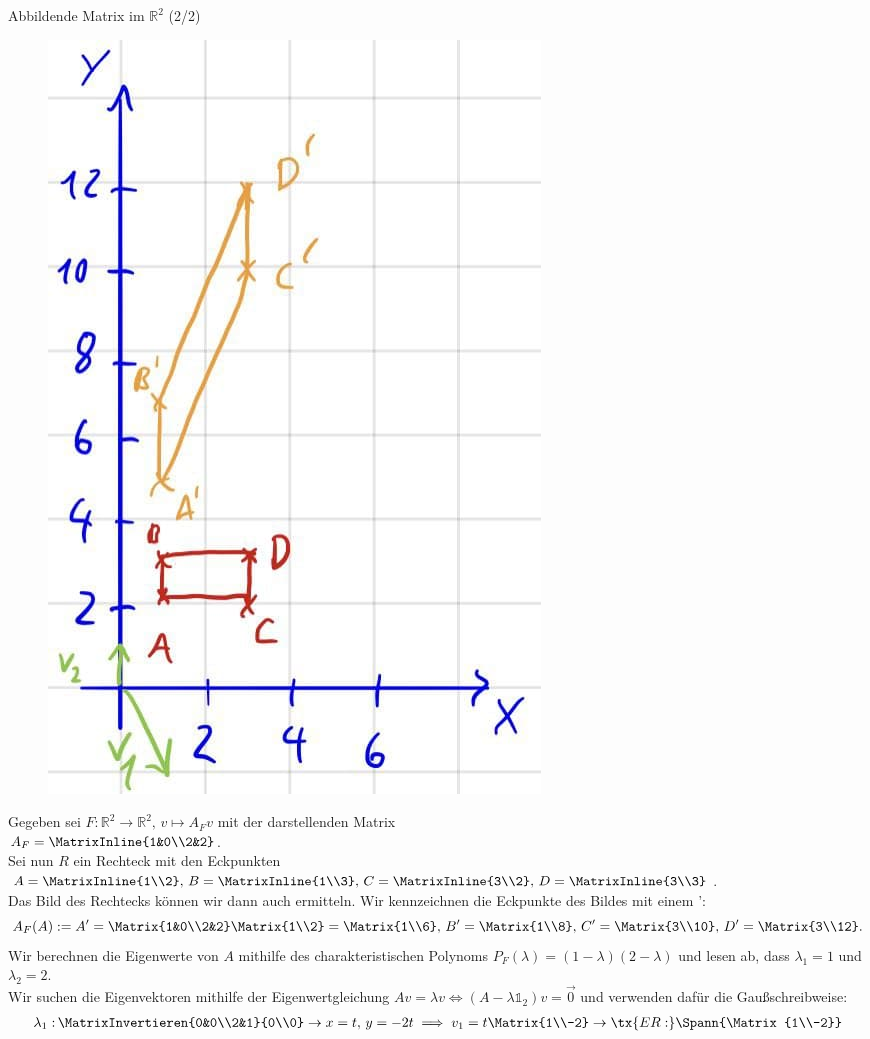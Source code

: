 \begin{Beispiel}
{Abbildende Matrix im $\mathbb{R}^2$ (2/2)}
\begin{figure}
 \vspace{-15pt}
\includegraphics[width=.15\textwidth]{Dateien/02/02Anschauung1.jpg}
 \vspace{-15pt}
\end{figure}
Gegeben sei $F:\mathbb{R}^2\to\mathbb{R}^2,\,v\mapsto A_Fv$ mit der darstellenden Matrix\\
$A_F=\MatrixInline{1&0\\2&2}$.\\
Sei nun $R$ ein Rechteck mit den Eckpunkten\\
$A=\MatrixInline{1\\2},\,B=\MatrixInline{1\\3},\,C=\MatrixInline{3\\2},\,D=\MatrixInline{3\\3}$.\\
Das Bild des Rechtecks können wir dann auch ermitteln.
Wir kennzeichnen die Eckpunkte des Bildes mit einem ':
\begin{equation*}
    A_F(A):=A'=\Matrix{1&0\\2&2}\Matrix{1\\2}=\Matrix{1\\6},\,B'=\Matrix{1\\8},\,C'=\Matrix{3\\10},\,D'=\Matrix{3\\12}.
\end{equation*}
Wir berechnen die Eigenwerte von $A$ mithilfe des charakteristischen Polynoms $P_F(\lambda)=(1-\lambda)(2-\lambda)$ und lesen ab, dass $\lambda_1=1$ und $\lambda_2=2$.\\
Wir suchen die Eigenvektoren mithilfe der Eigenwertgleichung $Av=\lambda v\iff (A-\lambda\mathds{1}_2)v=\Vec{0}$ und verwenden dafür die Gaußschreibweise:
\begin{align*}
    \lambda_1:&\,\MatrixInvertieren{0&0\\2&1}{0\\0}\to x=t, \,y=-2t\implies v_1=t\Matrix{1\\-2}\to \tx{ER: } \Spann{\Matrix{1\\-2}}\\

\end{align*}
\end{Beispiel}

